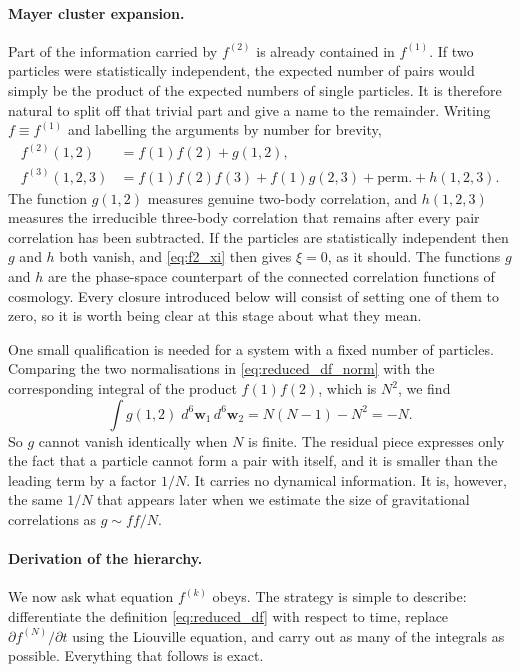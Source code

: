 \documentclass[12pt]{article}
\renewcommand{\vec}[1]{\bm{#1}}
\begin{document}
\paragraph{Mayer cluster expansion.}  Part of the information carried
by $f^{(2)}$ is already contained in $f^{(1)}$.  If two particles were
statistically independent, the expected number of pairs would simply be
the product of the expected numbers of single particles.  It is
therefore natural to split off that trivial part and give a name to the
remainder.  Writing $f\equiv f^{(1)}$ and labelling the arguments by
number for brevity,
%
\begin{align}
  f^{(2)}(1,2) &= f(1)f(2) + g(1,2),
  \label{eq:mayer2}\\
  f^{(3)}(1,2,3) &= f(1)f(2)f(3) + f(1)g(2,3) + \text{perm.} + h(1,2,3).
  \label{eq:mayer3}
\end{align}
%
The function $g(1,2)$ measures genuine two-body correlation, and
$h(1,2,3)$ measures the irreducible three-body correlation that remains
after every pair correlation has been subtracted.  If the particles are
statistically independent then $g$ and $h$ both vanish, and
\eqref{eq:f2_xi} then gives $\xi = 0$, as it should.  The functions $g$
and $h$ are the phase-space counterpart of the connected correlation
functions of cosmology.  Every closure introduced below will consist of
setting one of them to zero, so it is worth being clear at this stage
about what they mean.

One small qualification is needed for a system with a fixed number of
particles.  Comparing the two normalisations in
\eqref{eq:reduced_df_norm} with the corresponding integral of the
product $f(1)f(2)$, which is $N^2$, we find
%
\begin{equation}
  \int g(1,2)\;d^6\vec w_1\,d^6\vec w_2 = N(N-1) - N^2 = -N .
  \label{eq:g_self_term}
\end{equation}
%
So $g$ cannot vanish identically when $N$ is finite.  The residual
piece expresses only the fact that a particle cannot form a pair with
itself, and it is smaller than the leading term by a factor $1/N$.  It
carries no dynamical information.  It is, however, the same $1/N$ that
appears later when we estimate the size of gravitational correlations
as $g\sim ff/N$.

\paragraph{Derivation of the hierarchy.}  We now ask what equation
$f^{(k)}$ obeys.  The strategy is simple to describe: differentiate the
definition \eqref{eq:reduced_df} with respect to time, replace
$\partial f^{(N)}/\partial t$ using the Liouville equation, and carry
out as many of the integrals as possible.  Everything that follows is
exact.
\end{document}
